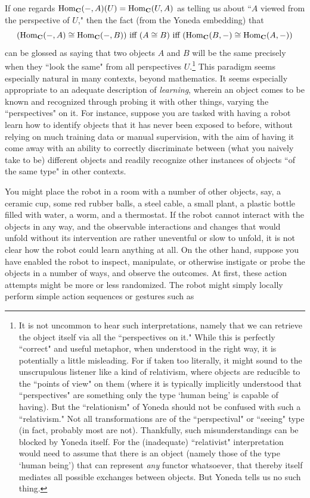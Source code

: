 \documentclass[11pt]{book}
\theoremstyle{definition}
\theoremstyle{definition}
\theoremstyle{definition}
\theoremstyle{theorem}
\theoremstyle{definition}
\begin{document}
If one regards $\text{Hom}_{\textbf{C}}(\--, A)(U) = \text{Hom}_{\textbf{C}}(U, A)$ as telling us about ``$A$ viewed from the perspective of $U$," then the fact (from the Yoneda embedding) that 
\begin{equation*}
(\text{Hom}_{\textbf{C}}(\--, A) \cong  \text{Hom}_{\textbf{C}}(\--, B)) \text{ iff } (A \cong B) \text{ iff } (\text{Hom}_{\textbf{C}}(B, \--) \cong  \text{Hom}_{\textbf{C}}(A, \--))
\end{equation*} 
can be glossed as saying that two objects $A$ and $B$ will be the same precisely when they ``look the same" from all perspectives $U$.\footnote{It is not uncommon to hear such interpretations, namely that we can retrieve the object itself via all the ``perspectives on it." While this is perfectly ``correct" and useful metaphor, when understood in the right way, it is potentially a little misleading. For if taken too literally, it might sound to the unscrupulous listener like a kind of relativism, where objects are reducible to the ``points of view" on them (where it is typically implicitly understood that ``perspectives" are something only the type `human being' is capable of having). But the ``relationism" of Yoneda should not be confused with such a ``relativism." Not all transformations are of the ``perspectival" or ``seeing" type (in fact, probably most are not). Thankfully, such misunderstandings can be blocked by Yoneda itself. For the (inadequate) ``relativist" interpretation would need to assume that there is an object (namely those of the type `human being') that can represent \textit{any} functor whatsoever, that thereby itself mediates all possible exchanges between objects. But Yoneda tells us no such thing.} This paradigm seems especially natural in many contexts, beyond mathematics. It seems especially appropriate to an adequate description of \textit{learning}, wherein an object comes to be known and recognized through probing it with other things, varying the ``perspectives" on it. For instance, suppose you are tasked with having a robot learn how to identify objects that it has never been exposed to before, without relying on much training data or manual supervision, with the aim of having it come away with an ability to correctly discriminate between (what you naively take to be) different objects and readily recognize other instances of objects ``of the same type" in other contexts. \par
You might place the robot in a room with a number of other objects, say, a ceramic cup, some red rubber balls, a steel cable, a small plant, a plastic bottle filled with water, a worm, and a thermostat. If the robot cannot interact with the objects in any way, and the observable interactions and changes that would unfold without its intervention are rather uneventful or slow to unfold, it is not clear how the robot could learn anything at all. On the other hand, suppose you have enabled the robot to inspect, manipulate, or otherwise instigate or probe the objects in a number of ways, and observe the outcomes. At first, these action attempts might be more or less randomized. The robot might simply locally perform simple action sequences or gestures such as 
\end{document}
